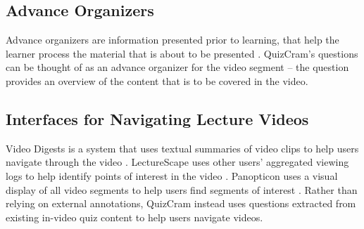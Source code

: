 \documentclass{sigchi}
\begin{document}

\subsection{Advance Organizers}

Advance organizers are information presented prior to learning, that help the learner process the material that is about to be presented  \cite{advanceorganizers}. QuizCram's questions can be thought of as an advance organizer for the video segment -- the question provides an overview of the content that is to be covered in the video. %

\subsection{Interfaces for Navigating Lecture Videos}

Video Digests is a system that uses textual summaries of video clips to help users navigate through the video \cite{videodigests}. LectureScape uses other users' aggregated viewing logs to help identify points of interest in the video \cite{lecturescape}. Panopticon uses a visual display of all video segments to help users find segments of interest \cite{panopticon}. Rather than relying on external annotations, QuizCram instead uses questions extracted from existing in-video quiz content to help users navigate videos. %

\end{document}
